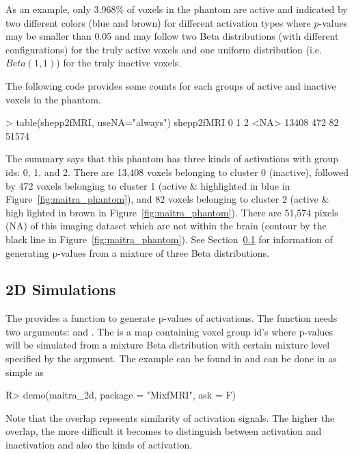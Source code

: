 As an example, only 3.968\% of voxels in the  phantom are active
and indicated by two different colors (blue and brown)
for different activation types where $p$-values may be smaller than 0.05
and may follow two Beta distributions (with different configurations)
for the truly active voxels and one uniform distribution (i.e. $Beta(1, 1)$)
for the truly inactive voxels.

The following code provides some counts for each groups of active and
inactive voxels in the  phantom.
\begin{CodeOutput}[title=Summary of shepp2fMRI Phantoms]
> table(shepp2fMRI, useNA="always")
shepp2fMRI
    0     1     2  <NA> 
13408   472    82 51574 
\end{CodeOutput}
The summary says that this phantom has three kinds of activations
with group ids: 0, 1, and 2.
There are 13,408 voxels belonging to cluster 0 (inactive),
followed by 472 voxels belonging to cluster 1 (active \& highlighted in
blue in Figure~\ref{fig:maitra_phantom}), and
82 voxels belonging to cluster 2 (active \& high lighted in
 brown in Figure~\ref{fig:maitra_phantom}).
There are 51,574 pixels (NA) of this
imaging dataset which are not within the brain (contour by the black line
in Figure~\ref{fig:maitra_phantom}).
See Section~\ref{sec:2d_simulations} for information of generating
p-values from a mixture of three Beta distributions.


\subsection[2D Simulations]{2D Simulations}
\label{sec:2d_simulations}

The  provides a function 
to generate p-values of activations.
The function needs two arguments:  and .
The  is a map containing voxel group id's
where p-values will be simulated from a mixture Beta distribution with
certain mixture level specified by the  argument.
The example can be found in
 and can be done in 
as simple as
\begin{Code}[title=Simulations of Active Voxels]
R> demo(maitra_2d, package = "MixfMRI", ask = F)
\end{Code}
Note that the overlap repesents similarity of activation signals. The higher
the overlap, the more difficult it becomes to distinguish between
activation and inactivation and also the kinds of activation. 

